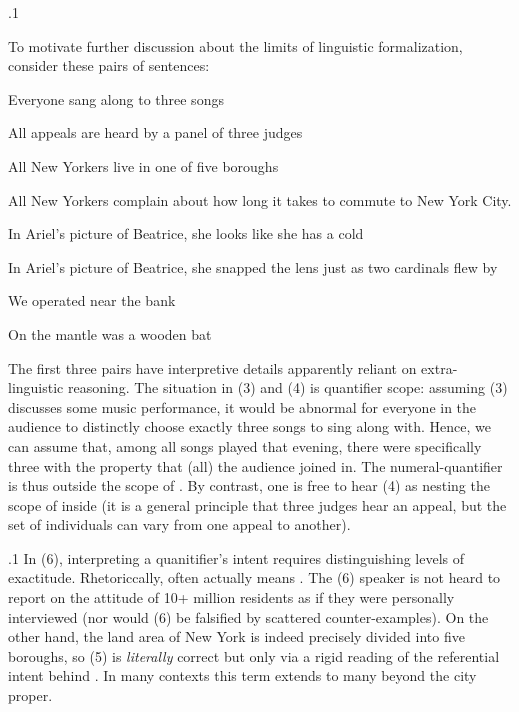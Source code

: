 \documentclass[11pt, twocolumn]{article}
\begin{document}
\p.1{%
To motivate further discussion about the limits of linguistic
formalization, consider these pairs of sentences:

\begin{exsGroup}

\exsItem{}   Everyone sang along to three songs

\exsItem{}   All appeals are heard by a panel of three judges

 \visbreak{}

\exsItem{}   All New Yorkers live in one of five boroughs

\exsItem{}   All New Yorkers complain about how long it takes to commute to New York City.

 \visbreak{}

\exsItem{}   In Ariel's picture of Beatrice, she looks like she has a cold

\exsItem{}   In Ariel's picture of Beatrice, she snapped the lens just as two cardinals flew by

 \visbreak{}

\exsItem{}   We operated near the bank

\exsItem{}   On the mantle was a wooden bat

\end{exsGroup}

\nip
The first three pairs have interpretive details apparently reliant on extra-linguistic
reasoning.  The situation in \exsRef(3) and \exsRef(4) is quantifier scope: assuming \exsRef(3) discusses some
music performance, it would be abnormal for everyone in the audience to distinctly choose
exactly three songs to sing along with.  Hence, we can assume that, among all songs
played that evening, there were specifically three with the property that (all) the audience
joined in.  The numeral-quantifier  is thus outside the scope of .
By contrast, one is free to hear \exsRef(4) as nesting the scope of  inside 
(it is a general principle that three judges hear an appeal, but the set of
individuals can vary from one appeal to another).
} %

\p.1{%
In \exsRef(6), interpreting a quanitifier's intent requires distinguishing levels of exactitude.  Rhetoriccally,
 often actually means .  The \exsRef(6) speaker is not heard to
report on the attitude of 10+ million residents as if they were personally interviewed (nor would \exsRef(6) be
falsified by scattered counter-examples).  On the other hand, the land area of New York is indeed
precisely divided into five boroughs, so \exsRef(5) is \textit{literally} correct \mdash{} but only via a rigid
reading of the referential intent behind .  In many contexts this term extends
to many beyond the city proper.
} %
\end{document}
